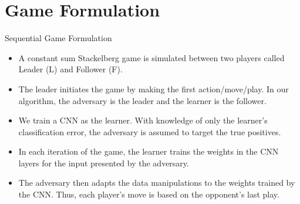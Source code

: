 \documentclass[10pt]{beamer}
\begin{document}


\section{Game Formulation}

\begin{frame}{Sequential Game Formulation}
	\begin{itemize}
        \item A constant sum Stackelberg game is simulated between two players called Leader (L) and Follower (F). \item The leader initiates the game by making the first action/move/play. In our algorithm, the adversary is the leader and the learner is the follower. 
        \item We train a CNN as the learner. With knowledge of only the learner’s classification error, the adversary is assumed to target the true positives.
        \item In each iteration of the game, the learner trains the weights in the CNN layers for the input presented by the adversary. 
        \item The adversary then adapts the data manipulations to the weights trained by the CNN. Thus, each player’s move is based on the opponent’s last play.
	\end{itemize}
\end{frame}
\end{document}

